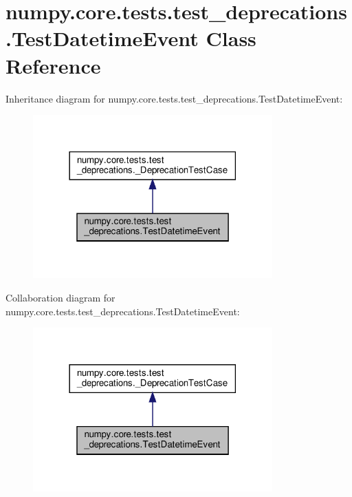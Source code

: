 \hypertarget{classnumpy_1_1core_1_1tests_1_1test__deprecations_1_1TestDatetimeEvent}{}\section{numpy.\+core.\+tests.\+test\+\_\+deprecations.\+Test\+Datetime\+Event Class Reference}
\label{classnumpy_1_1core_1_1tests_1_1test__deprecations_1_1TestDatetimeEvent}


Inheritance diagram for numpy.\+core.\+tests.\+test\+\_\+deprecations.\+Test\+Datetime\+Event\+:
\nopagebreak
\begin{figure}[H]
\begin{center}
\leavevmode
\includegraphics[width=261pt]{classnumpy_1_1core_1_1tests_1_1test__deprecations_1_1TestDatetimeEvent__inherit__graph}
\end{center}
\end{figure}


Collaboration diagram for numpy.\+core.\+tests.\+test\+\_\+deprecations.\+Test\+Datetime\+Event\+:
\nopagebreak
\begin{figure}[H]
\begin{center}
\leavevmode
\includegraphics[width=261pt]{classnumpy_1_1core_1_1tests_1_1test__deprecations_1_1TestDatetimeEvent__coll__graph}
\end{center}
\end{figure}
